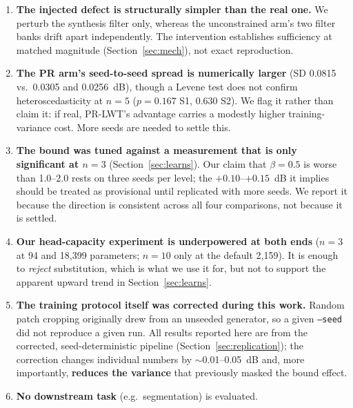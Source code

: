 \documentclass[conference]{IEEEtran}
\begin{document}
\begin{enumerate}
Section~\ref{sec:eval} documents --- cross-paper PSNR on this dataset carries a
$\sim$2~dB noise floor, which is \textbf{larger than every effect reported in
this paper}. That is why no literature-quoted number appears in any comparison we
draw, and why the efficiency claim in Section~\ref{sec:structure} is stated
against a single same-protocol baseline rather than against a Pareto frontier of
published methods.
\item \textbf{The injected defect is structurally simpler than the real one.} We
perturb the synthesis filter only, whereas the unconstrained arm's two filter
banks drift apart independently. The intervention establishes sufficiency at
matched magnitude (Section~\ref{sec:mech}), not exact reproduction.
\item \textbf{The PR arm's seed-to-seed spread is numerically larger}
(SD 0.0815 vs.\ 0.0305 and 0.0256~dB), though a Levene test does not confirm
heteroscedasticity at $n=5$ ($p=0.167$ S1, $0.630$ S2). We flag it rather than
claim it: if real, PR-LWT's advantage carries a modestly higher training-variance
cost. More seeds are needed to settle this.
\item \textbf{The bound was tuned against a measurement that is only significant
at $n = 3$} (Section~\ref{sec:learns}). Our claim that $\beta = 0.5$ is worse than
1.0--2.0 rests on three seeds per level; the $+0.10$--$+0.15$~dB it implies
should be treated as provisional until replicated with more seeds. We report it
because the direction is consistent across all four comparisons, not because it
is settled.
\item \textbf{Our head-capacity experiment is underpowered at both ends} ($n = 3$
at 94 and 18{,}399 parameters; $n = 10$ only at the default 2{,}159). It is enough
to \emph{reject} substitution, which is what we use it for, but not to support the
apparent upward trend in Section~\ref{sec:learns}.
\item \textbf{The training protocol itself was corrected during this work.} Random
patch cropping originally drew from an unseeded generator, so a given
\texttt{--seed} did not reproduce a given run. All results reported here are from
the corrected, seed-deterministic pipeline (Section~\ref{sec:replication}); the
correction changes individual numbers by $\sim$0.01--0.05~dB and, more
importantly, \textbf{reduces the variance} that previously masked the bound effect.
\item \textbf{No downstream task} (e.g.\ segmentation) is evaluated.
\end{enumerate}
\end{document}
